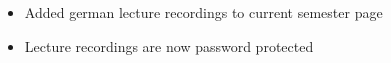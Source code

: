 \begin{frame}{\LectureFeedbackLectureTitle}
\begin{itemize}
\item <2->Added german lecture recordings to current semester page
\item <3->Lecture recordings are now password protected
\end{itemize}
\end{frame}
